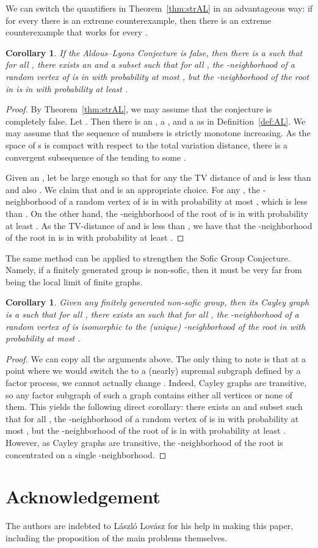 \documentclass[12pt,a4paper]{article}
\newtheorem{Corollary}[Theorem]{Corollary}
\renewcommand{\:}{\colon}
\begin{document}
We can switch the quantifiers in Theorem~\ref{thm:strAL} in an advantageous way: if for every  there is an extreme counterexample, then there is an extreme counterexample that works for every . 

\begin{Corollary}
If the Aldous--Lyons Conjecture is false, then there is a   such that for all , there exists an  and a subset  such that for all , the -neighborhood of a random vertex of  is in  with probability at most , but the -neighborhood of the root in  is in  with probability at least .
\end{Corollary}
\begin{proof}
By Theorem~\ref{thm:strAL}, we may assume that the conjecture is completely false. 
Let . 
Then there is an , a , and a   as in Definition~\ref{def:AL}. 
We may assume that the sequence of numbers  is strictly monotone increasing. 
As the space of s is compact with respect to the total variation distance, there is a convergent subsequence of the  tending to some  . 

Given an , let  be large enough so that for any  the TV distance of  and  is less than  and also . 
We claim that  and  is an appropriate choice. 
For any , the -neighborhood of a random vertex of  is in  with probability at most , which is less than . 
On the other hand, the -neighborhood of the root of  is in  with probability at least . 
As the TV-distance of  and  is less than , we have that the -neighborhood of the root in  is in  with probability at least . 
\end{proof}

The same method can be applied to strengthen the Sofic Group Conjecture. 
Namely, if a finitely generated group is non-sofic, then it must be very far from being the local limit of finite graphs. 

\begin{Corollary}
Given any finitely generated non-sofic group, then its Cayley graph is a   such that for all , there exists an  such that for all , the -neighborhood of a random vertex of  is isomorphic to the (unique) -neighborhood of the root in  with probability at most .
\end{Corollary}
\begin{proof}
We can copy all the arguments above. 
The only thing to note is that at a point where we would switch the  to a (nearly) supremal subgraph defined by a factor process, we cannot actually change . 
Indeed, Cayley graphs are transitive, so any factor subgraph of such a graph contains either all vertices or none of them. 
This yields the following direct corollary: 
there exists an  and subset  such that for all , the -neighborhood of a random vertex of  is in  with probability at most , but the -neighborhood of the root of  is in  with probability at least . 
However, as Cayley graphs are transitive, the -neighborhood of the root is concentrated on a single -neighborhood. 
\end{proof}

\section{Acknowledgement}

The authors are indebted to L\'aszl\'o Lov\'asz for his help in making this paper, including the proposition of the main problems themselves.




\end{document}
